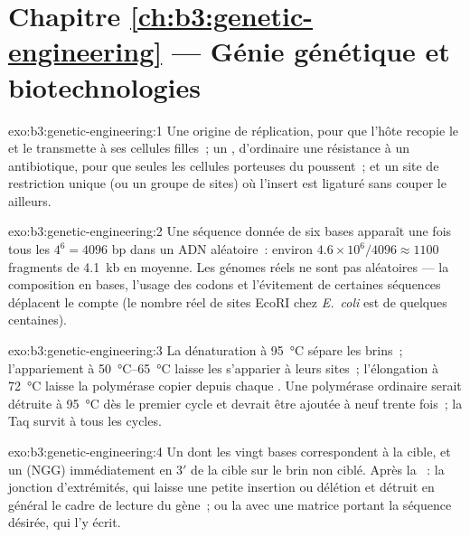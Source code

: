 \section*{Chapitre \ref{ch:b3:genetic-engineering} --- Génie génétique et biotechnologies}

\begin{solution}{exo:b3:genetic-engineering:1}
Une origine de réplication, pour que l'hôte recopie le  et le
transmette à ses cellules filles~; un ,
d'ordinaire une résistance à un antibiotique, pour que seules les
cellules porteuses du  poussent~; et un site de restriction
unique (ou un groupe de sites) où l'insert est ligaturé sans couper le
 ailleurs.
\end{solution}

\begin{solution}{exo:b3:genetic-engineering:2}
Une séquence donnée de six bases apparaît une fois tous les
$4^{6} = 4096$ bp dans un ADN aléatoire~: environ
$4.6\times 10^{6}/4096 \approx 1100$ fragments de \qty{4.1}{kb} en
moyenne. Les génomes réels ne sont pas aléatoires --- la composition en
bases, l'usage des codons et l'évitement de certaines séquences
déplacent le compte (le nombre réel de sites EcoRI chez \emph{E.~coli}
est de quelques centaines).
\end{solution}

\begin{solution}{exo:b3:genetic-engineering:3}
La dénaturation à \qty{95}{\celsius} sépare les brins~; l'appariement à
\qtyrange{50}{65}{\celsius} laisse les  s'apparier à leurs
sites~; l'élongation à \qty{72}{\celsius} laisse la polymérase copier
depuis chaque . Une polymérase ordinaire serait détruite à
\qty{95}{\celsius} dès le premier cycle et devrait être ajoutée à neuf
trente fois~; la Taq survit à tous les cycles.
\end{solution}

\begin{solution}{exo:b3:genetic-engineering:4}
Un  dont les vingt bases correspondent à la cible, et un 
(NGG) immédiatement en 3$'$ de la cible sur le brin non ciblé. Après la
~: la jonction d'extrémités, qui laisse une petite
insertion ou délétion et détruit en général le cadre de lecture du
gène~; ou la  avec une matrice portant la
séquence désirée, qui l'y écrit.
\end{solution}

